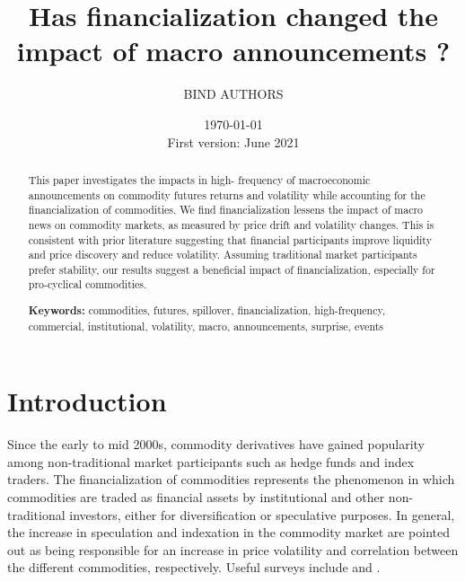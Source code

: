 \documentclass[12pt]{article}
\title{Has financialization changed the impact of macro announcements ?%
}
\author{BIND AUTHORS}
\date{ \today \\ First version: June 2021}
\begin{document}
\begin{titlepage}
\maketitle





\begin{abstract}
\noindent 
\singlespacing
This paper investigates the impacts in high- frequency of macroeconomic announcements on commodity futures returns and volatility while accounting for the financialization of commodities. We find financialization lessens the impact of macro news on commodity markets, as measured by price drift and volatility changes. This is consistent with prior literature suggesting that financial participants improve liquidity and price discovery and reduce volatility. Assuming traditional market participants prefer stability, our results suggest a beneficial impact of financialization, especially for pro-cyclical commodities.

\vspace{0.2in}
\noindent\textbf{Keywords:} commodities, futures,  spillover, financialization, high-frequency, commercial, institutional, volatility, macro, announcements, surprise, events\\


\bigskip
\end{abstract}
\setcounter{page}{0}
\thispagestyle{empty}
\end{titlepage}
\pagebreak \newpage




\doublespacing
\section{Introduction} \label{sec:introduction}
Since the early to mid 2000s, commodity derivatives have gained popularity among non-traditional market participants such as hedge funds and index traders. The financialization of commodities represents the phenomenon in which commodities are traded as financial assets by institutional and other non-traditional investors, either for diversification or speculative purposes. In general, the increase in speculation and indexation in the commodity market are pointed out as being responsible for an increase in price volatility and correlation between the different commodities, respectively. Useful surveys include \citet{boyd2018update} and \citet{cheng2014financialization}.
\end{document}
